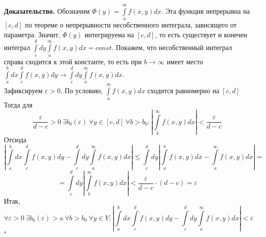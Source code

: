 \textbf{Доказательство.} Обозначим $\Phi(y)=\int\limits_{a}^{\infty}
f(x,y)dx$. Эта функция непрерывна на $[c,d]$ по теореме о 
непрерывности несобственного интеграла, зависящего от параметра. Значит,
$\Phi(y)$ интегрируема на  $[c,d]$, то есть существует и конечен 
интеграл  $\int\limits_{c}^{d}dy\int\limits_{a}^{\infty}f(x,y)dx=const$.
Покажем, что несобственный интеграл справа сходится к этой константе, то
есть при $b\to \infty$ имеет место
$\int\limits_{a}^{b} dx\int\limits_{c}^{d}f(x,y)dy\to
\int\limits_{c}^{d} dy \int\limits_{a}^{\infty} f(x,y)dx$. \\
Зафиксируем $\varepsilon>0$. По условию, $\int\limits_{a}^{\infty}f(x,y)dx$
сходится равномерно на $[c,d]$ Тогда для 
$$\frac{\varepsilon}{d-c}>0~\exists b_0(\varepsilon)~\forall y\in [c,d]~
\forall b>b_0:\left| \int\limits_{b}^{\infty}f(x,y)dx \right|<
\frac{\varepsilon}{d-c}$$
 Отсюда
$$\left| \int\limits_{a}^{b} dx\int\limits_{c}^{d}f(x,y)dy-
\int\limits_{c}^{d}dy \int\limits_{a}^{\infty}f(x,y)dx \right|\leqslant 
 \int\limits_{c}^{d}dy\left| \int\limits_{a}^{b} f(x,y)dx-
 \int\limits_{a}^{\infty} f(x,y)dx\right| =$$
$$=\int\limits_{c}^{d} dy\left| \int\limits_{b}^{\infty} f(x,y)dx \right|
<\frac{\varepsilon}{d-c}\cdot (d-c)=\varepsilon$$ 
Итак, 
$$\forall \varepsilon>0~\exists b_0(\varepsilon)>a~\forall b>b_0~\forall y\in 
Y:\left|  \int\limits_{a}^{b} dx\int\limits_{c}^{d}f(x,y)dy-
\int\limits_{c}^{d}dy \int\limits_{a}^{\infty}f(x,y)dx \right| <
\varepsilon$$ $\square$ 








